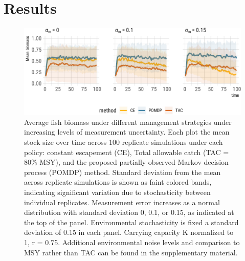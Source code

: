 \documentclass[3p]{elsarticle} %
\makeatletter
\def\maxwidth{\ifdim\Gin@nat@width>\linewidth\linewidth
\else\Gin@nat@width\fi}
\let\Oldincludegraphics\includegraphics
\renewcommand{\includegraphics}[1]{\Oldincludegraphics[width=\maxwidth]{#1}}
\makeatother
\begin{document}
\hypertarget{results}{%
\section{Results}\label{results}}

\begin{figure}
\centering
\includegraphics{manuscript_files/figure-latex/sims-1.pdf}
\caption{Average fish biomass under different management strategies
under increasing levels of measurement uncertainty. Each plot the mean
stock size over time across 100 replicate simulations under each policy:
constant escapement (CE), Total allowable catch (TAC = 80\% MSY), and
the proposed partially observed Markov decision process (POMDP) method.
Standard deviation from the mean across replicate simulations is shown
as faint colored bands, indicating significant variation due to
stochasticity between individual replicates. Measurement error increases
as a normal distribution with standard deviation 0, 0.1, or 0.15, as
indicated at the top of the panel. Environmental stochasticity is fixed
a standard deviation of 0.15 in each panel. Carrying capacity K
normalized to 1, r = 0.75. Additional environmental noise levels and
comparison to MSY rather than TAC can be found in the supplementary
material. \label{sims}}
\end{figure}
\end{document}
